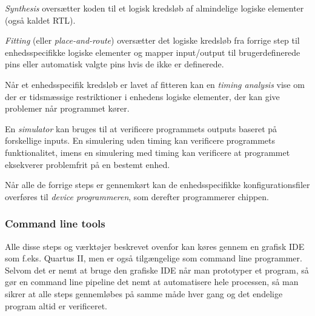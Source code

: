 \emph{Synthesis} oversætter koden til et logisk kredsløb af almindelige logiske elementer (også kaldet
RTL).

\emph{Fitting} (eller \emph{place-and-route}) oversætter det logiske
kredsløb fra forrige step til enhedsspecifikke logiske elementer og mapper
input/output til brugerdefinerede pins eller automatisk valgte pins hvis de ikke
er definerede.

Når et enhedsspecifik kredsløb er lavet af fitteren kan en \emph{timing analysis} vise om der er tidsmæssige restriktioner i enhedens
logiske elementer, der kan give problemer når programmet kører.

En \emph{simulator} kan bruges til at verificere programmets outputs baseret på
forskellige inputs. En simulering uden timing kan verificere programmets
funktionalitet, imens en simulering med timing kan verificere at programmet
eksekverer problemfrit på en bestemt enhed.

Når alle de forrige steps er gennemkørt kan de enhedsspecifikke
konfigurationsfiler overføres til \emph{device programmeren}, som derefter
programmerer chippen.

\subsubsection{Command line tools}

Alle disse steps og værktøjer beskrevet ovenfor kan køres gennem en grafisk IDE
som f.eks. Quartus II, men er også tilgængelige som command line programmer.
Selvom det er nemt at bruge den grafiske IDE når man prototyper et program, så
gør en command line pipeline det nemt at automatisere hele processen, så man
sikrer at alle steps gennemløbes på samme måde hver gang og det endelige program
altid er verificeret.
